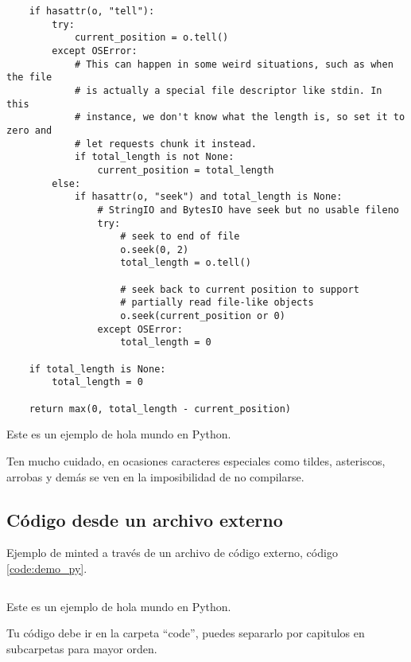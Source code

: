 \begin{code}
\begin{verbatim}
    if hasattr(o, "tell"):
        try:
            current_position = o.tell()
        except OSError:
            # This can happen in some weird situations, such as when the file
            # is actually a special file descriptor like stdin. In this
            # instance, we don't know what the length is, so set it to zero and
            # let requests chunk it instead.
            if total_length is not None:
                current_position = total_length
        else:
            if hasattr(o, "seek") and total_length is None:
                # StringIO and BytesIO have seek but no usable fileno
                try:
                    # seek to end of file
                    o.seek(0, 2)
                    total_length = o.tell()

                    # seek back to current position to support
                    # partially read file-like objects
                    o.seek(current_position or 0)
                except OSError:
                    total_length = 0

    if total_length is None:
        total_length = 0

    return max(0, total_length - current_position)
    \end{verbatim}
    \caption{Este es un ejemplo de hola mundo en Python.}
    \label{code:request_partial}
\end{code}

Ten mucho cuidado, en ocasiones caracteres especiales como tildes,
asteriscos, arrobas y demás se ven en la imposibilidad de no 
compilarse.

\subsection{Código desde un archivo externo}

Ejemplo de minted a través de un archivo de código externo, código \ref{code:demo_py}.

\begin{code}
    \inputminted[bgcolor=gray_background, xleftmargin=10pt, linenos=true, breaklines, fontsize=\footnotesize]{python}{codigo/capitulo_1/demo.py}
    \caption{Este es un ejemplo de hola mundo en Python.}
    \label{code:demo_py}
\end{code}

Tu código debe ir en la carpeta ``code'', puedes separarlo 
por capitulos en subcarpetas para mayor orden.
